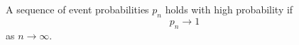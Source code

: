 \begin{definition}
A sequence of event probabilities \(p_n\) holds with high probability if
\[
p_n\to 1
\]
as \(n\to\infty\).
\end{definition}
